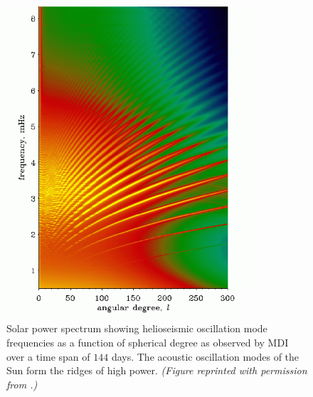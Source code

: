 \begin{figure}
    \centering
    \includegraphics[width=0.8\textwidth]{pics/rhodes.png}
    \caption[Solar power spectrum from MDI]{Solar power spectrum showing helioseismic oscillation mode frequencies as a function of spherical degree as observed by MDI over a time span of $144$ days. 
    The acoustic oscillation modes of the Sun form the ridges of high power. 
        \emph{(Figure reprinted with permission from \citealt{1997SoPh..175..287R}.)}
        \label{fig:rhodes-mdi}}
\end{figure}




